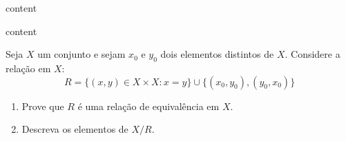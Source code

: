 \begin{exercicio}
	content
\end{exercicio}
\begin{solucao}
	content
\end{solucao}

\begin{exercicio}
	Seja $X$ um conjunto e sejam $x_0$ e $y_0$ dois elementos distintos de $X$. Considere a relação em $X$:
	$$R=\{(x,y)\in X\times X:x=y\}\cup\{(x_0,y_0),(y_0,x_0)\}$$
	\begin{enumerate}[label=(\alph{*})]
		\item Prove que $R$ é uma relação de equivalência em $X$.
		\item Descreva os elementos de $X/R$.
	\end{enumerate}
\end{exercicio}
